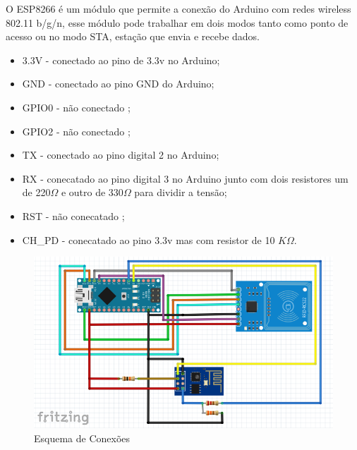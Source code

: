 \par
O ESP8266 é um módulo que permite a conexão do Arduino com redes wireless 802.11 b/g/n, esse módulo pode 
trabalhar em dois modos tanto como ponto de acesso ou no modo STA, estação que envia e recebe dados. 
\begin{itemize}
    \item 3.3V - conectado ao pino de 3.3v no Arduino;
    \item GND - conectado ao pino GND do Arduino;
    \item GPIO0 - não conectado ;
    \item GPIO2 - não conectado ; 
    \item TX - conectado ao pino digital 2 no Arduino;
    \item RX - conecatado ao pino digital 3 no Arduino junto com dois resistores um de 220$\Omega$ e outro de 330$\Omega$ para dividir a tensão;
    \item RST - não conecatado ;
    \item CH\_PD - conecatado ao pino 3.3v mas com resistor de 10 $K\Omega$.
\end{itemize}


\begin{figure}[H]
              \caption{\label{fig:esq_conexoes}{Esquema de Conexões}}
              \centering
              \includegraphics[width=1\textwidth]{Figuras/esquema_de_conexoes2.PNG}
\end{figure}
